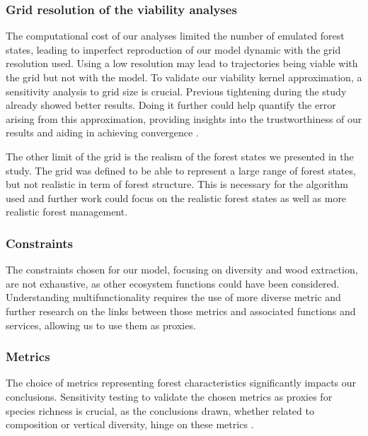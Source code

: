 \documentclass{article}
\begin{document}
\subsubsection{Grid resolution of the viability analyses}

The computational cost of our analyses limited the number of emulated forest states, leading to imperfect reproduction of our model dynamic with the grid resolution used. Using a low resolution may lead to trajectories being viable with the grid but not with the model. To validate our viability kernel approximation, a sensitivity analysis to grid size is crucial. Previous tightening during the study already showed better results. Doing it further could help quantify the error arising from this approximation, providing insights into the trustworthiness of our results and aiding in achieving convergence \autocite{saint-pierreApproximationViabilityKernel1994}.

The other limit of the grid is the realism of the forest states we presented in the study. The grid was defined to be able to represent a large range of forest states, but not realistic in term of forest structure. This is necessary for the algorithm used and further work could focus on the realistic forest states as well as more realistic forest management.

\subsubsection{Constraints}

The constraints chosen for our model, focusing on diversity and wood extraction, are not exhaustive, as other ecosystem functions could have been considered. Understanding multifunctionality requires the use of more diverse metric and further research on the links between those metrics and associated functions and services, allowing us to use them as proxies.

\subsubsection{Metrics}

The choice of metrics representing forest characteristics significantly impacts our conclusions. Sensitivity testing to validate the chosen metrics as proxies for species richness is crucial, as the conclusions drawn, whether related to composition or vertical diversity, hinge on these metrics \autocite{juckerClimateModulatesEffects2016, guldinRoleUnevenAgedSilviculture1996, noletComparingEffectsEven2018}.
\end{document}
